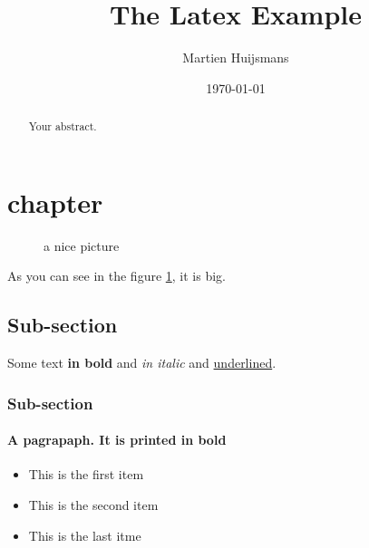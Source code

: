\documentclass[a4paper]{article}
\author{Martien Huijsmans}
\title{The Latex Example}
\date{\today}
\begin{document}
\maketitle

\tableofcontents

\begin{abstract}
Your abstract.
\end{abstract}

\newpage

\section{chapter}

\begin{figure}[h!]
    \centering
    \caption{a nice picture}
    \label{fig:universe1}
\end{figure}
As you can see in the figure \ref{fig:universe1}, it is big.

\subsection{Sub-section}

Some text \textbf{in bold} and \textit{in italic} and \underline{underlined}.

\subsubsection{Sub-section}

\paragraph{A pagrapaph. It is printed in bold}
\begin{itemize}
\item This is the first item
\item This is the second item
\item This is the last itme
\end{itemize}
\end{document}
